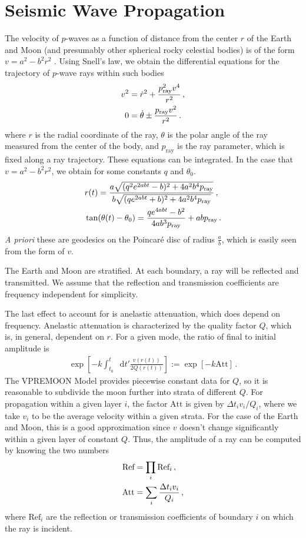 \documentclass[prd,reprint,10pt]{revtex4-1}
\newcommand*\diff{\mathop{}\!\mathrm{d}}
\newcommand*\te[1]{\text{#1}}
\newcommand*\ps[1]{\left[#1\right]}
\newcommand*\f[2]{\frac{#1}{#2}}
\begin{document}
\section{Seismic Wave Propagation}
The velocity of $p$-waves as a function of distance from the center $r$ of the Earth and Moon (and presumably other spherical rocky celestial bodies) is of the form $v = a^2 - b^2 r^2$ \cite{garcia2011very}\cite{dziewonski1981preliminary}. Using Snell's law, we obtain the differential equations for the trajectory of $p$-wave rays within such bodies
\begin{align}
v^2 \notag&= \dot r^2 + \f{p_\te{ray}^2 v^4}{r^2}\,,\\
0 &=\dot\theta\pm\f{p_\te{ray} v^2}{r^2}\,.
\end{align}
where $r$ is the radial coordinate of the ray, $\theta$ is the polar angle of the ray measured from the center of the body, and $p_\te{ray}$ is the ray parameter, which is fixed along a ray trajectory. These equations can be integrated. In the case that $v = a^2 - b^2 r^2$, we obtain for some constants $q$ and $\theta_0$.
\begin{align}
\notag&r(t) = \f{a\sqrt{(q^2e^{2abt}-b)^2 + 4a^2b^4 p_\te{ray}}}{b\sqrt{(qe^{2abt}+b)^2 + 4a^2b^4 p_\te{ray}}}\,,\\
&\tan(\theta(t) - \theta_0) = \f{qe^{4abt}-b^2}{4ab^3p_\te{ray}}+abp_\te{ray}\,.
\end{align}
\textit{A priori} these are geodesics on the Poincar\'e disc of radius $\f ab$, which is easily seen from the form of $v$.

The Earth and Moon are stratified. At each boundary, a ray will be reflected and transmitted. We assume that the reflection and transmission coefficients are frequency independent for simplicity. 

The last effect to account for is anelastic attenuation, which does depend on frequency. Anelastic attenuation is characterized by the quality factor $Q$, which is, in general, dependent on $r$. For a given mode, the ratio of final to initial amplitude is
\begin{align}
\exp\ps{-k \int_{t_0}^t\diff t'\f{v(r(t))}{2Q(r(t))}}:=\exp\ps{-k \te{Att}}\,.
\end{align}
The VPREMOON Model \cite{garcia2011very} provides piecewise constant data for $Q$, so it is reasonable to subdivide the moon further into strata of different $Q$. For propagation within a given layer $i$, the factor $\te{Att}$ is given by $\Delta t_i v_i/Q_i$, where we take $v_i$ to be the average velocity within a given strata. For the case of the Earth and Moon, this is a good approximation since $v$ doesn't change significantly within a given layer of constant $Q$. Thus, the amplitude of a ray can be computed by knowing the two numbers
\begin{align}
\te{Ref} \notag&= \prod_i\te{Ref}_i\,,\\
\te{Att} &=\sum_i\f{\Delta t_i v_i}{Q_i}\,,
\end{align}
where $\te{Ref}_i$ are the reflection or transmission coefficients of boundary $i$ on which the ray is incident.
\end{document}
